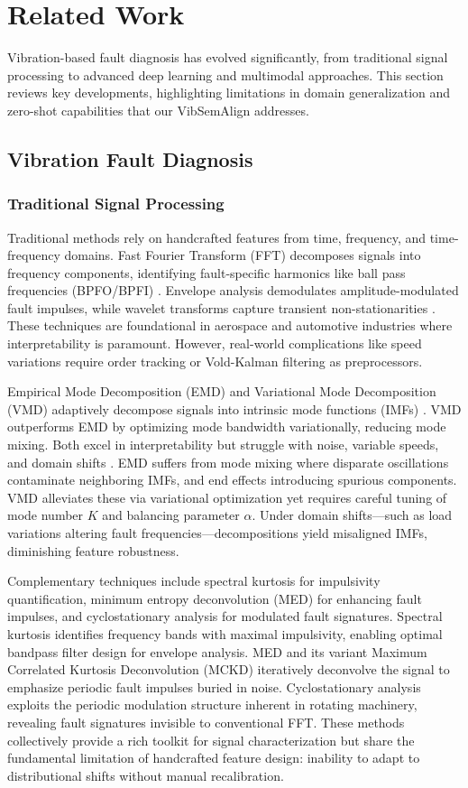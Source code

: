 \section{Related Work}

Vibration-based fault diagnosis has evolved significantly, from traditional signal processing to advanced deep learning and multimodal approaches. This section reviews key developments, highlighting limitations in domain generalization and zero-shot capabilities that our VibSemAlign addresses.

\subsection{Vibration Fault Diagnosis}
\subsubsection{Traditional Signal Processing}
Traditional methods rely on handcrafted features from time, frequency, and time-frequency domains. Fast Fourier Transform (FFT) decomposes signals into frequency components, identifying fault-specific harmonics like ball pass frequencies (BPFO/BPFI) \cite{cite1}. Envelope analysis demodulates amplitude-modulated fault impulses, while wavelet transforms capture transient non-stationarities \cite{cite2}. These techniques are foundational in aerospace and automotive industries where interpretability is paramount. However, real-world complications like speed variations require order tracking or Vold-Kalman filtering as preprocessors.

Empirical Mode Decomposition (EMD) and Variational Mode Decomposition (VMD) adaptively decompose signals into intrinsic mode functions (IMFs) \cite{cite3}. VMD outperforms EMD by optimizing mode bandwidth variationally, reducing mode mixing. Both excel in interpretability but struggle with noise, variable speeds, and domain shifts \cite{cite10}. EMD suffers from mode mixing where disparate oscillations contaminate neighboring IMFs, and end effects introducing spurious components. VMD alleviates these via variational optimization yet requires careful tuning of mode number $K$ and balancing parameter $\alpha$. Under domain shifts---such as load variations altering fault frequencies---decompositions yield misaligned IMFs, diminishing feature robustness.

Complementary techniques include spectral kurtosis for impulsivity quantification, minimum entropy deconvolution (MED) for enhancing fault impulses, and cyclostationary analysis for modulated fault signatures. Spectral kurtosis identifies frequency bands with maximal impulsivity, enabling optimal bandpass filter design for envelope analysis. MED and its variant Maximum Correlated Kurtosis Deconvolution (MCKD) iteratively deconvolve the signal to emphasize periodic fault impulses buried in noise. Cyclostationary analysis exploits the periodic modulation structure inherent in rotating machinery, revealing fault signatures invisible to conventional FFT. These methods collectively provide a rich toolkit for signal characterization but share the fundamental limitation of handcrafted feature design: inability to adapt to distributional shifts without manual recalibration.

